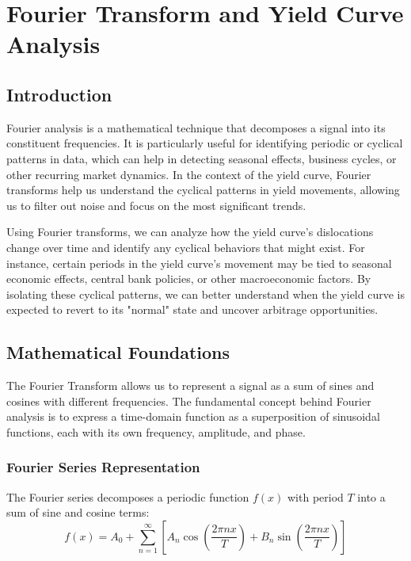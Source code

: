 \documentclass[12pt]{article}
\begin{document}
\vspace{3em}



\section{Fourier Transform and Yield Curve Analysis}

\subsection{Introduction}
Fourier analysis is a mathematical technique that decomposes a signal into its constituent frequencies. It is particularly useful for identifying periodic or cyclical patterns in data, which can help in detecting seasonal effects, business cycles, or other recurring market dynamics. In the context of the yield curve, Fourier transforms help us understand the cyclical patterns in yield movements, allowing us to filter out noise and focus on the most significant trends.

Using Fourier transforms, we can analyze how the yield curve’s dislocations change over time and identify any cyclical behaviors that might exist. For instance, certain periods in the yield curve’s movement may be tied to seasonal economic effects, central bank policies, or other macroeconomic factors. By isolating these cyclical patterns, we can better understand when the yield curve is expected to revert to its "normal" state and uncover arbitrage opportunities.

\subsection{Mathematical Foundations}
The Fourier Transform allows us to represent a signal as a sum of sines and cosines with different frequencies. The fundamental concept behind Fourier analysis is to express a time-domain function as a superposition of sinusoidal functions, each with its own frequency, amplitude, and phase.

\subsubsection{Fourier Series Representation}
The Fourier series decomposes a periodic function $f(x)$ with period $T$ into a sum of sine and cosine terms:
\[
f(x) = A_0 + \sum_{n=1}^{\infty} \left[ A_n \cos \left( \frac{2\pi nx}{T} \right) + B_n \sin \left( \frac{2\pi nx}{T} \right) \right]
\]
\end{document}
